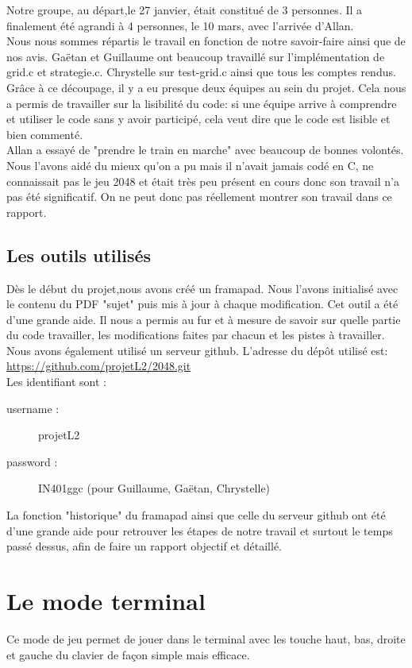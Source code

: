 \documentclass{report}
\begin{document}
Notre groupe, au départ,le 27 janvier, était constitué de 3 personnes. Il a finalement été agrandi à 4 personnes, le 10 mars, avec l'arrivée d'Allan.\\ Nous nous sommes répartis le travail en fonction de notre savoir-faire ainsi que de nos avis. Gaëtan et Guillaume ont beaucoup travaillé sur l'implémentation de grid.c et strategie.c. Chrystelle sur test-grid.c ainsi que tous les comptes rendus. Grâce à ce découpage, il y a eu presque deux équipes au sein du projet. Cela nous a permis de travailler sur la lisibilité du code: si une équipe arrive à comprendre et utiliser le code sans y avoir participé, cela veut dire que le code est lisible et bien commenté.\\ Allan a essayé de "prendre le train en marche" avec beaucoup de bonnes volontés. Nous l'avons aidé du mieux qu'on a pu mais il n'avait jamais codé en C, ne connaissait pas le jeu 2048 et était très peu présent en cours donc son travail n'a pas été significatif. On ne peut donc pas réellement montrer son travail dans ce rapport.
\section{Les outils utilisés}
Dès le début du projet,nous avons créé un framapad. Nous l'avons initialisé avec le contenu du PDF "sujet" puis mis à jour à chaque modification. Cet outil a été d'une grande aide. Il nous a permis au fur et à mesure de savoir sur quelle partie du code travailler, les modifications faites par chacun et les pistes à travailler. \\
Nous avons également utilisé un serveur github. L'adresse du dépôt utilisé est: \url{https://github.com/projetL2/2048.git} \\Les identifiant sont :
\begin{description}
\item [username : ] projetL2
\item [password : ] IN401ggc  (pour Guillaume, Gaëtan, Chrystelle)
\end{description}
La fonction "historique" du framapad ainsi que celle du serveur github ont été d'une grande aide pour retrouver les étapes de notre travail et surtout le temps passé dessus, afin de faire un rapport objectif et détaillé.

\chapter{Le mode terminal}
Ce mode de jeu permet de jouer dans le terminal avec les touche haut, bas, droite et gauche du clavier de façon simple mais efficace.
\end{document}
